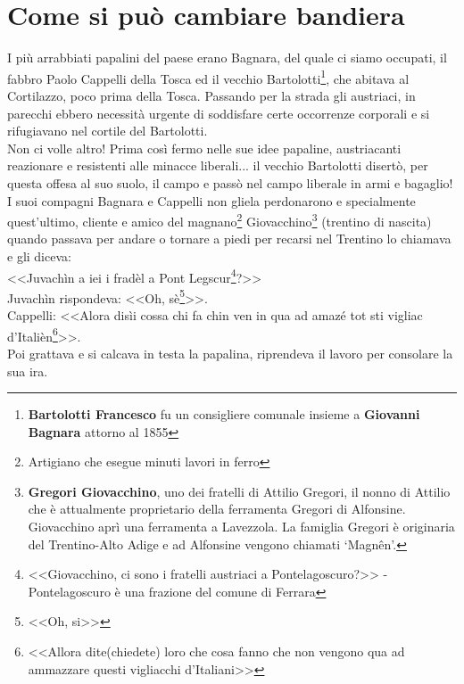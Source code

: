 
\chapter{Come si può cambiare bandiera}
I più arrabbiati papalini del paese erano Bagnara, del quale ci siamo occupati, il fabbro Paolo Cappelli della Tosca ed il vecchio Bartolotti\footnote{\textbf{Bartolotti Francesco} fu un consigliere comunale insieme a \textbf{Giovanni Bagnara} attorno al 1855}, che abitava al Cortilazzo, poco prima della Tosca. Passando per la strada gli austriaci, in parecchi ebbero necessità urgente di soddisfare certe occorrenze corporali e si rifugiavano nel cortile del Bartolotti.\\
\indent Non ci volle altro! Prima così fermo nelle sue idee papaline, austriacanti reazionare e resistenti alle minacce liberali... il vecchio Bartolotti disertò, per questa offesa al suo suolo, il campo e passò nel campo liberale in armi e bagaglio!\\
\indent I suoi compagni Bagnara e Cappelli non gliela perdonarono e specialmente quest'ultimo, cliente e amico del magnano\footnote{Artigiano che esegue minuti lavori in ferro} Giovacchino\footnote{\textbf{Gregori Giovacchino}, uno dei fratelli di Attilio Gregori, il nonno di Attilio che è attualmente proprietario della ferramenta Gregori di Alfonsine. Giovacchino aprì una ferramenta a Lavezzola. La famiglia Gregori è originaria del Trentino-Alto Adige e ad Alfonsine vengono chiamati `Magnên'.} (trentino di nascita) quando passava per andare o tornare a piedi per recarsi nel Trentino lo chiamava e gli diceva:\\
\indent <<Juvachìn a iei i fradèl a Pont Legscur\footnote{<<Giovacchino, ci sono i fratelli austriaci a Pontelagoscuro?>> - Pontelagoscuro è una frazione del comune di Ferrara}?>>\\
\indent Juvachìn rispondeva: <<Oh, sè\footnote{<<Oh, si>>}>>.\\
\indent {}Cappelli: <<Alora disìi cossa chi fa chin ven in qua ad amazé tot sti vigliac d'Italièn\footnote{<<Allora dite(chiedete) loro che cosa fanno che non vengono qua ad ammazzare questi vigliacchi d'Italiani>>}>>.\\
\indent Poi grattava e si calcava in testa la papalina, riprendeva il lavoro per consolare la sua ira.


